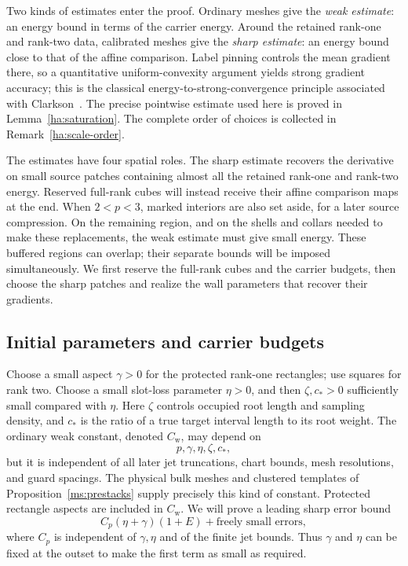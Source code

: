 \documentclass[11pt]{article}
\numberwithin{equation}{section}
\theoremstyle{definition}
\theoremstyle{remark}
\begin{document}
Two kinds of estimates enter the proof.  Ordinary meshes give the
\emph{weak estimate}: an energy bound in terms of the carrier energy.
Around the retained rank-one and rank-two data, calibrated meshes give
the \emph{sharp estimate}: an energy bound close to that of the affine
comparison.  Label pinning controls the mean gradient there, so a
quantitative uniform-convexity argument yields strong gradient accuracy;
this is the classical energy-to-strong-convergence principle associated
with Clarkson~\cite{Clarkson1936}.  The precise pointwise estimate used
here is proved in Lemma~\ref{ha:saturation}.  The complete order of choices
is collected in Remark~\ref{ha:scale-order}.

The estimates have four spatial roles.  The sharp estimate recovers
the derivative on small source patches containing almost all the
retained rank-one and rank-two energy.  Reserved full-rank cubes
will instead receive their affine comparison maps at the end.
When $2<p<3$, marked interiors are also set aside, for a later
source compression.  On the remaining region, and on the shells
and collars needed to make these replacements, the weak estimate
must give small energy.  These buffered regions can overlap;
their separate bounds will be imposed simultaneously.  We first
reserve the full-rank cubes and the carrier budgets, then choose
the sharp patches and realize the wall parameters that recover
their gradients.

\subsection{Initial parameters and carrier budgets}
\label{ha:initial}

Choose a small aspect $\gamma>0$ for the protected rank-one rectangles;
use squares for rank two.  Choose a small slot-loss parameter $\eta>0$,
and then $\zeta,c_*>0$ sufficiently small compared with $\eta$.
Here $\zeta$ controls occupied root length and sampling density, and
$c_*$ is the ratio of a true target interval length to its root weight.
The ordinary weak constant, denoted $C_{\mathrm w}$, may depend on
\[
                       p,\gamma,\eta,\zeta,c_* ,
\]
but it is independent of all later jet truncations, chart bounds,
mesh resolutions, and guard spacings.  The physical bulk meshes and
clustered templates of Proposition~\ref{ms:prestacks} supply precisely
this kind of constant.  Protected rectangle aspects are included in
$C_{\mathrm w}$.  We will prove a leading sharp error bound
\begin{equation}\label{ha:leading-error}
 C_p(\eta+\gamma)(1+E)+\text{freely small errors},
\end{equation}
where $C_p$ is independent of $\gamma,\eta$ and of the finite jet
bounds.  Thus $\gamma$ and $\eta$ can be fixed at the outset to make
the first term as small as required.
\end{document}
